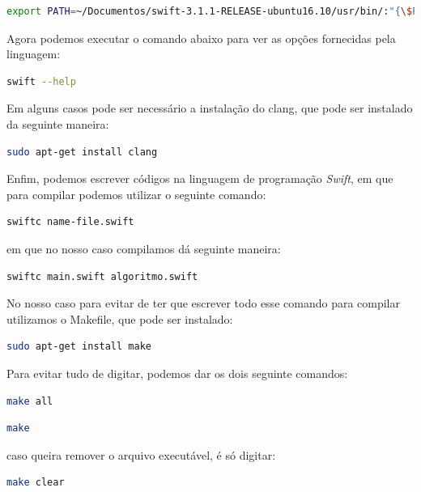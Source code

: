 \documentclass[
	12pt,				%
	oneside,   	        %
	a4paper,			%
	english,			%
	french,				%
	spanish,			%
	brazil,				%
	]{pacotes/abntex2}
\begin{document}
\begin{lstlisting}[language=bash]
  export PATH=~/Documentos/swift-3.1.1-RELEASE-ubuntu16.10/usr/bin/:"{\$PATH}"
\end{lstlisting}

Agora podemos executar o comando abaixo para ver as opções fornecidas pela linguagem:

\begin{lstlisting}[language=bash]
  swift --help
\end{lstlisting}

Em alguns casos pode ser necessário a instalação do clang, que pode ser instalado da seguinte maneira: 

\begin{lstlisting}[language=bash]
  sudo apt-get install clang
\end{lstlisting}

Enfim, podemos escrever códigos na linguagem de programação \textit{Swift}, em que para compilar podemos utilizar o seguinte comando:

\begin{lstlisting}[language=bash]
  swiftc name-file.swift
\end{lstlisting}

em que no nosso caso compilamos dá seguinte maneira: 

\begin{lstlisting}[language=bash]
  swiftc main.swift algoritmo.swift
\end{lstlisting}

No nosso caso para evitar de ter que escrever todo esse comando para compilar utilizamos o Makefile, que pode ser instalado: 

\begin{lstlisting}[language=bash]
    sudo apt-get install make
\end{lstlisting}

Para evitar tudo de digitar, podemos dar os dois seguinte comandos:

\begin{lstlisting}[language=bash]
    make all 
\end{lstlisting}

\begin{lstlisting}[language=bash]
    make
\end{lstlisting}

caso queira remover o arquivo executável, é só digitar: 

\begin{lstlisting}[language=bash]
    make clear
\end{lstlisting}
\end{document}
